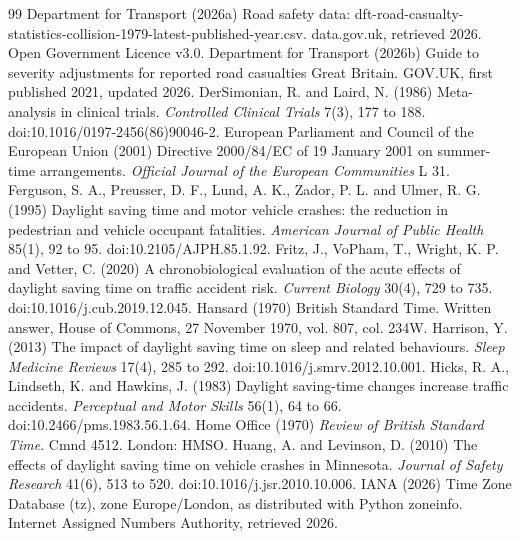 \documentclass[11pt,a4paper]{article}
\begin{document}
\begin{thebibliography}{99}
 Department for Transport (2026a) Road safety data: dft-road-casualty-statistics-collision-1979-latest-published-year.csv. data.gov.uk, retrieved 2026. Open Government Licence v3.0.
 Department for Transport (2026b) Guide to severity adjustments for reported road casualties Great Britain. GOV.UK, first published 2021, updated 2026.
 DerSimonian, R. and Laird, N. (1986) Meta-analysis in clinical trials. \textit{Controlled Clinical Trials} 7(3), 177 to 188. doi:10.1016/0197-2456(86)90046-2.
 European Parliament and Council of the European Union (2001) Directive 2000/84/EC of 19 January 2001 on summer-time arrangements. \textit{Official Journal of the European Communities} L 31.
 Ferguson, S. A., Preusser, D. F., Lund, A. K., Zador, P. L. and Ulmer, R. G. (1995) Daylight saving time and motor vehicle crashes: the reduction in pedestrian and vehicle occupant fatalities. \textit{American Journal of Public Health} 85(1), 92 to 95. doi:10.2105/AJPH.85.1.92.
 Fritz, J., VoPham, T., Wright, K. P. and Vetter, C. (2020) A chronobiological evaluation of the acute effects of daylight saving time on traffic accident risk. \textit{Current Biology} 30(4), 729 to 735. doi:10.1016/j.cub.2019.12.045.
 Hansard (1970) British Standard Time. Written answer, House of Commons, 27 November 1970, vol. 807, col. 234W.
 Harrison, Y. (2013) The impact of daylight saving time on sleep and related behaviours. \textit{Sleep Medicine Reviews} 17(4), 285 to 292. doi:10.1016/j.smrv.2012.10.001.
 Hicks, R. A., Lindseth, K. and Hawkins, J. (1983) Daylight saving-time changes increase traffic accidents. \textit{Perceptual and Motor Skills} 56(1), 64 to 66. doi:10.2466/pms.1983.56.1.64.
 Home Office (1970) \textit{Review of British Standard Time}. Cmnd 4512. London: HMSO.
 Huang, A. and Levinson, D. (2010) The effects of daylight saving time on vehicle crashes in Minnesota. \textit{Journal of Safety Research} 41(6), 513 to 520. doi:10.1016/j.jsr.2010.10.006.
 IANA (2026) Time Zone Database (tz), zone Europe/London, as distributed with Python zoneinfo. Internet Assigned Numbers Authority, retrieved 2026.

\end{thebibliography}
\end{document}
